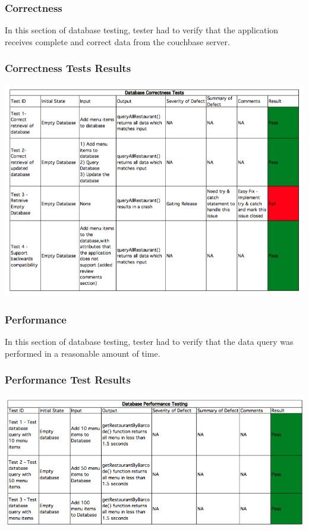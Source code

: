 \documentclass[12pt, titlepage]{article}
\begin{document}
\subsubsection{Correctness}
In this section of database testing, tester had to verify that the application receives complete and correct data from the couchbase server.
\subsubsection{Correctness Tests Results}
\includegraphics[width=\textwidth,height=\textheight,keepaspectratio]{correctness_tests.png}

\subsubsection{Performance}
In this section of database testing, tester had to verify that the data query was performed in a reasonable amount of time. 
\subsubsection{Performance Test Results}
\includegraphics[width=\textwidth,height=\textheight,keepaspectratio]{performance_tests.png}
\end{document}
